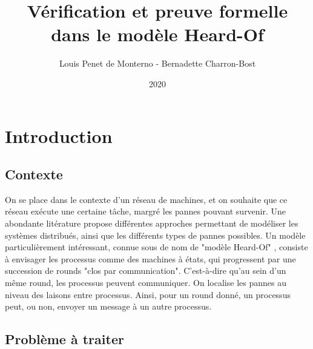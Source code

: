 \documentclass{article}
\title{Vérification et preuve formelle dans le modèle Heard-Of}
\date{2020}
\author{Louis Penet de Monterno - Bernadette Charron-Bost}
\begin{document}
\maketitle

\section{Introduction}

\subsection{Contexte}

On se place dans le contexte d'un réseau de machines, et on souhaite que ce réseau exécute une certaine tâche, margré les pannes pouvant survenir.
Une abondante litérature propose différentes approches permettant de modéliser les systèmes distribués, ainsi que les différents types de pannes possibles.
Un modèle particulièrement intéressant, connue sous de nom de "modèle Heard-Of" \cite{model_ho},
consiste à envisager les processus comme des machines à états, qui progressent par une succession de rounds "clos par communication".
C'est-à-dire qu'au sein d'un même round, les processus peuvent communiquer.
On localise les pannes au niveau des laisons entre processus. Ainsi, pour un round donné, un processus peut, ou non, envoyer un message à un autre processus.

\subsection{Problème à traiter}
\end{document}

